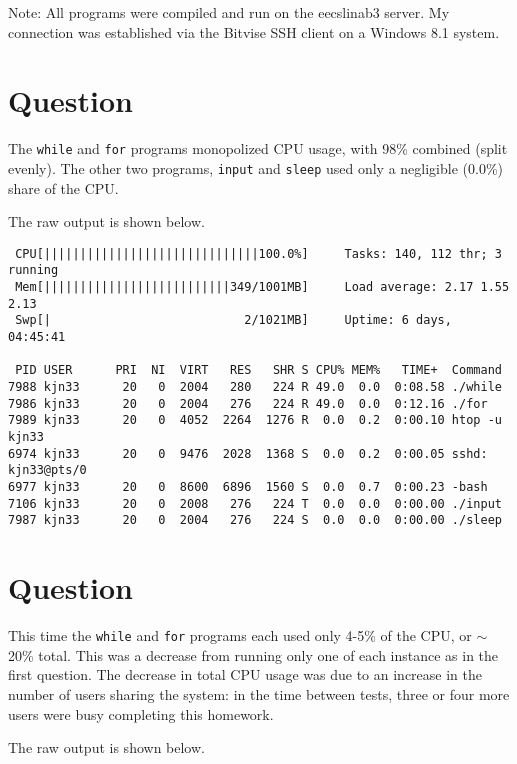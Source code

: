 \documentclass[letterpaper]{article}
\begin{document}
Note: All programs were compiled and run on the eecslinab3 server.
My connection was established via the Bitvise SSH client on a Windows 8.1
system.

\section{Question}

The \texttt{while} and \texttt{for} programs monopolized CPU usage,
with 98\% combined (split evenly). The other two programs, \texttt{input} and
\texttt{sleep} used only a negligible (0.0\%) share of the CPU.

The raw output is shown below.

\begin{verbatim}
 CPU[||||||||||||||||||||||||||||||100.0%]     Tasks: 140, 112 thr; 3 running
 Mem[||||||||||||||||||||||||||349/1001MB]     Load average: 2.17 1.55 2.13
 Swp[|                           2/1021MB]     Uptime: 6 days, 04:45:41

 PID USER      PRI  NI  VIRT   RES   SHR S CPU% MEM%   TIME+  Command
7988 kjn33      20   0  2004   280   224 R 49.0  0.0  0:08.58 ./while
7986 kjn33      20   0  2004   276   224 R 49.0  0.0  0:12.16 ./for
7989 kjn33      20   0  4052  2264  1276 R  0.0  0.2  0:00.10 htop -u kjn33
6974 kjn33      20   0  9476  2028  1368 S  0.0  0.2  0:00.05 sshd: kjn33@pts/0
6977 kjn33      20   0  8600  6896  1560 S  0.0  0.7  0:00.23 -bash
7106 kjn33      20   0  2008   276   224 T  0.0  0.0  0:00.00 ./input
7987 kjn33      20   0  2004   276   224 S  0.0  0.0  0:00.00 ./sleep
\end{verbatim}

\section{Question}

This time the \texttt{while} and \texttt{for} programs each used only 4-5\%
of the CPU, or $\sim$20\% total. This was a decrease from running only one
of each instance as in the first question. The decrease in total CPU usage
was due to an increase in the number of users sharing the system: in the
time between tests, three or four more users were busy completing this
homework.

The raw output is shown below.
\end{document}
